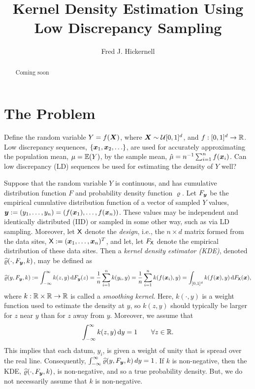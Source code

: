 \documentclass[letterpaper]{amsart}
\newcommand{\hvarrho}{\widehat{\varrho}}
\begin{document}
\title{Kernel Density Estimation Using Low Discrepancy Sampling}
\author{Fred J. Hickernell}
\begin{abstract} Coming soon
\end{abstract}

\maketitle

\section{The Problem} \label{sec:problem}

Define the random variable $Y = f(\boldsymbol{X})$, where $\boldsymbol{X} \sim \mathcal{U}[0,1]^d$, and $f:[0,1]^d \to \mathbb{R}$.  Low discrepancy sequences, $\{\boldsymbol{x}_1, \boldsymbol{x}_2, \ldots \}$, are used for accurately approximating  the population mean, $\mu = \operatorname{\mathbb{E}}(Y)$, by the sample mean, $\hat{\mu} = n^{-1} \sum_{i=1}^n f(\boldsymbol{x}_i)$.   Can low discrepancy (LD) sequences be used for estimating the density of $Y$ well?

Suppose that  the random variable $Y$ is continuous, and has cumulative distribution function $F$ and probability density function $\varrho$.  Let $F_{\boldsymbol{y}}$ be the empirical cumulative distribution function of a vector of sampled $Y$ values, $\boldsymbol{y} := (y_1, \ldots, y_n) = (f(\boldsymbol{x}_1), \ldots, f(\boldsymbol{x}_n))$.  These values may be independent and identically distributed (IID) or sampled in some other way, such as via LD sampling.  Moreover, let $\mathsf{X}$ denote the \emph{design}, i.e., the $n \times d$ matrix formed from the data sites, $\mathsf{X}:=(\boldsymbol{x}_1, \ldots, \boldsymbol{x}_n)^T$, and let, let $F_{\mathsf{X}}$ denote the empirical distribution of  these data sites.  Then a \emph{kernel density estimator (KDE)}, denoted $\hvarrho(\cdot,F_{\vy},k)$, may be defined  as
\begin{equation} \label{eq:kdedef}
	\hvarrho(y,F_{\vy},k) := \int_{-\infty}^{\infty} k(z,y) \, \dif F_{\vy}(z)  = \frac 1n \sum_{i=1}^n k(y_i,y) \\
	= \frac 1n \sum_{i=1}^n k(f(\vx_i),y) = \int_{[0,1]^d} k(f(\vx),y) \, \dif F_\mX(\vx),
\end{equation}
where $k:\mathbb{R} \times \mathbb{R} \to \mathbb{R}$ is called a \emph{smoothing kernel}.  Here, $k(\cdot,y)$ is a weight function used to estimate the density at $y$, so $k(z,y)$ should typically be larger for $z$ near $y$ than for $z$ away from $y$.   Moreover, we assume that
\begin{equation}
	\label{eq:kintegral}
	\int_{-\infty}^{\infty} k(z,y) \, {\rm d} y = 1 \qquad \forall z \in \mathbb{R}.
\end{equation}
This implies that each datum, $y_i$, is given a weight of unity that is spread over the real line.  Consequently, $\int_{-\infty}^{\infty} \hvarrho(y,F_{\vy},k) \, dy = 1$.  If $k$ is non-negative, then the KDE, $\hvarrho(\cdot,F_{\vy},k)$, is non-negative, and so a true probability density.  But, we do not necessarily assume that $k$ is non-negative.
\end{document}
